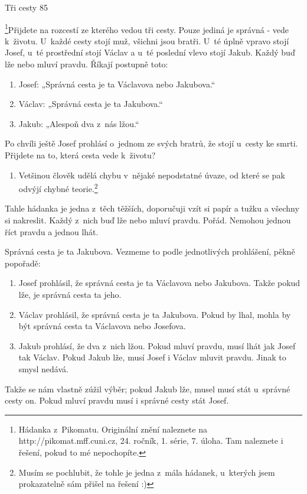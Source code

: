 Tři cesty
85 %

\footnote{Hádanka z~Pikomatu. Originální znění naleznete na http://pikomat.mff.cuni.cz, 24. ročník, 1. série, 7. úloha. Tam naleznete i řešení, pokud to mé nepochopíte.}Přijdete na rozcestí ze kterého vedou tři cesty. Pouze jediná je správná - vede k~životu. U~každé cesty stojí muž, všichni jsou bratři. U~té úplně vpravo stojí Josef, u~té prostřední stojí Václav a u~té poslední vlevo stojí Jakub. Každý buď lže nebo mluví pravdu. Říkají postupně toto:
\begin{enumerate}
\item Josef: „Správná cesta je ta Václavova nebo Jakubova.“
\item Václav: „Správná cesta je ta Jakubova.“
\item Jakub: „Alespoň dva z~nás lžou.“
\end{enumerate}
Po chvíli ještě Josef prohlásí o~jednom ze svých bratrů, že stojí u~cesty ke smrti. Přijdete na to, která cesta vede k~životu?

\begin{enumerate}
\item Vetšinou člověk udělá chybu v~nějaké nepodstatné úvaze, od které se pak odvýjí chybné teorie.\footnote{Musím se pochlubit, že tohle je jedna z~mála hádanek, u~kterých jsem prokazatelně sám přišel na řešení :)}
\end{enumerate}

Tahle hádanka je jedna z~těch těžších, doporučuji vzít si papír a tužku a všechny si nakreslit. Každý z~nich buď lže nebo mluví pravdu. Pořád. Nemohou jednou říct pravdu a jednou lhát.

Správná cesta je ta Jakubova. Vezmeme to podle jednotlivých prohlášení, pěkně popořadě:
\begin{enumerate}
\item Josef prohlásil, že správná cesta je ta Václavova nebo Jakubova. Takže pokud lže, je správná cesta ta jeho.
\item Václav prohlásil, že správná cesta je ta Jakubova. Pokud by lhal, mohla by být správná cesta ta Václavova nebo Josefova.
\item Jakub prohlásí, že dva z~nich lžou. Pokud mluví pravdu, musí lhát jak Josef tak Václav. Pokud Jakub lže, musí Josef i Václav mluvit pravdu. Jinak to smysl nedává.
\end{enumerate}

Takže se nám vlastně zúžil výběr; pokud Jakub lže, musel musí stát u~správné cesty on. Pokud mluví pravdu musí i správné cesty stát Josef.

